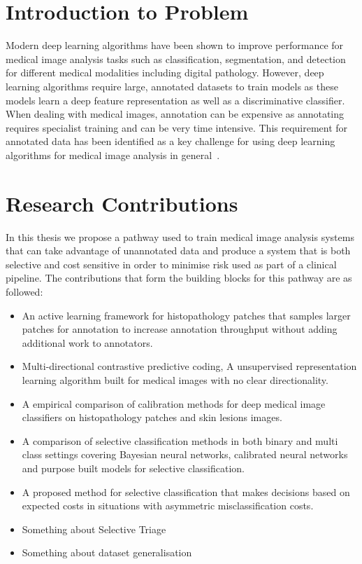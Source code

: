 \section{Introduction to Problem}
\label{sec:intoduction_to_problem}
Modern deep learning algorithms have been shown to improve performance for medical image analysis tasks such as classification, segmentation, and detection for different medical modalities including digital pathology. However, deep learning algorithms require large, annotated datasets to train models as these models learn a deep feature representation as well as a discriminative classifier. When dealing with medical images, annotation can be expensive as annotating requires specialist training and can be very time intensive. This requirement for annotated data has been identified as a key challenge for using deep learning algorithms for medical image analysis in general~\citep{litjens2017survey}. 


\section{Research Contributions}
\label{sec:research_contributions}

In this thesis we propose a pathway used to train medical image analysis systems that can take advantage of unannotated data and produce a system that is both selective and cost sensitive in order to minimise risk used as part of a clinical pipeline. The contributions that form the building blocks for this pathway are as followed:

\begin{itemize}
	\item An active learning framework for histopathology patches that samples larger patches for annotation to increase annotation throughput without adding additional work to annotators.
	
	\item Multi-directional contrastive predictive coding, A unsupervised representation learning algorithm built for medical images with no clear directionality.

	\item A empirical comparison of calibration methods for deep medical image classifiers on histopathology patches and skin lesions images.
	
	\item A comparison of selective classification methods in both binary and multi class settings covering Bayesian neural networks, calibrated neural networks and purpose built models for selective classification.
	
	\item A proposed method for selective classification that makes decisions based on expected costs in situations with asymmetric misclassification costs.
	
	\item Something about Selective Triage
	
	\item Something about dataset generalisation
\end{itemize}



